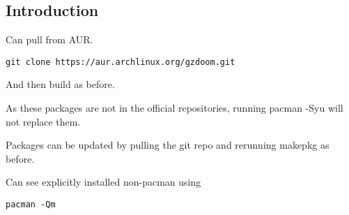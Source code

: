 
\subsection{Introduction}

Can pull from AUR.
\begin{verbatim}
git clone https://aur.archlinux.org/gzdoom.git
\end{verbatim}

And then build as before.

As these packages are not in the official repositories, running pacman -Syu will not replace them.

Packages can be updated by pulling the git repo and rerunning makepkg as before.

Can see explicitly installed non-pacman using
\begin{verbatim}
pacman -Qm
\end{verbatim}

